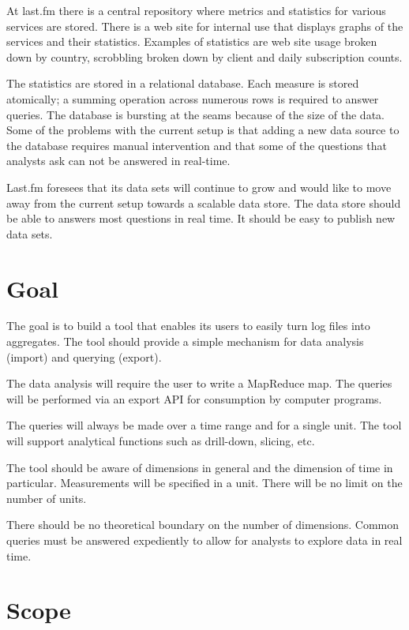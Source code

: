 \documentclass[a4paper,10pt]{book}
\begin{document}
At last.fm there is a central repository where metrics and statistics for
various services are stored. There is a web site for internal use that
displays graphs of the services and their statistics. Examples of statistics
are web site usage broken down by country, scrobbling broken down by client
and daily subscription counts.

The statistics are stored in a relational database. Each measure is stored
atomically; a summing operation across numerous rows is required to answer
queries. The database is bursting at the seams because of the size of the
data. Some of the problems with the current setup is that adding a new data
source to the database requires manual intervention and that some of the
questions that analysts ask can not be answered in real-time.

Last.fm foresees that its data sets will continue to grow and would like to
move away from the current setup towards a scalable data store. The data store
should be able to answers most questions in real time. It should be easy
to publish new data sets.


\section{Goal}

The goal is to build a tool that enables its users to easily turn log files
into aggregates. The tool should provide a simple mechanism for data analysis
(import) and querying (export).

The data analysis will require the user to write a MapReduce map. The queries
will be performed via an export API for consumption by computer programs.

The queries will always be made over a time range and for a single unit. The
tool will support analytical functions such as drill-down, slicing, etc.

The tool should be aware of dimensions in general and the dimension of time in
particular. Measurements will be specified in a unit. There will be no limit
on the number of units.

There should be no theoretical boundary on the number of dimensions. Common
queries must be answered expediently to allow for analysts to explore data in
real time.



\section{Scope}
\end{document}
